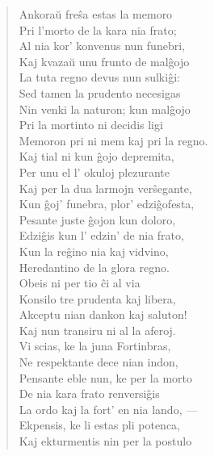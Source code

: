 \begin{verse}
 
Ankora\u u fre\^sa estas la memoro\\
                Pri l'morto de la kara nia frato;\\
                Al nia kor' konvenus nun funebri,\\
                Kaj kvaza\u u unu frunto de mal\^gojo\\
                La tuta regno devus nun sulki\^gi:\\
                Sed tamen la prudento necesigas\\
                Nin venki la naturon; kun mal\^gojo\\
                Pri la mortinto ni decidis ligi\\
                Memoron pri ni mem kaj pri la regno.\\
                Kaj tial ni kun \^gojo depremita,\\
                Per unu el l' okuloj plezurante\\
                Kaj per la dua larmojn ver\^segante,\\
                Kun \^goj' funebra, plor' edzi\^gofesta,\\
                Pesante juste \^gojon kun doloro,\\
                Edzi\^gis kun l' edzin' de nia frato,\\
                Kun la reĝino nia kaj vidvino,\\
                Heredantino de la glora regno.\\
                Obeis ni per tio \^ci al via\\
                Konsilo tre prudenta kaj libera,\\
                Akceptu nian dankon kaj saluton!\\
                Kaj nun transiru ni al la aferoj.\\
                \vin Vi scias, ke la juna Fortinbras,\\
                Ne respektante dece nian indon,\\
                Pensante eble nun, ke per la morto\\
                De nia kara frato renversi\^gis\\
                La ordo kaj la fort' en nia lando, ---\\
                Ekpensis, ke li estas pli potenca,\\
                Kaj ekturmentis nin per la postulo\\

\end{verse}
